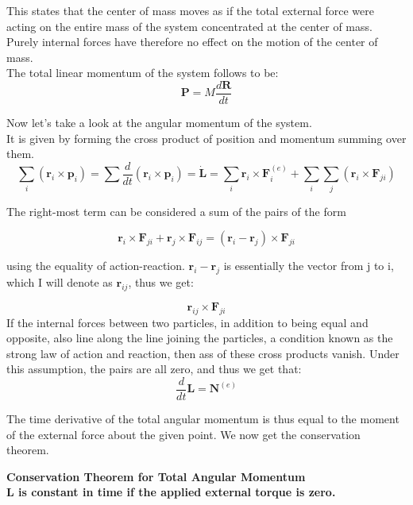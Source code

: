 \documentclass{article}
\newcommand{\bb}[1]{\begin{tcolorbox}
  \textbf{#1}
\end{tcolorbox}}
\begin{document}
This states that the center of mass moves as if the total external force were acting on the entire mass of the system concentrated at the center of mass. Purely internal forces have therefore no effect on the motion of the center of mass.
\\
The total linear momentum of the system follows to be:\\

\begin{equation*}
    \textbf{P} = M \frac{d \textbf{R}}{dt}
\end{equation*}

Now let's take a look at the angular momentum of the system.
\\
It is given by forming the cross product of position and momentum summing over them.\\

\begin{equation*}
    \sum\limits_i (\textbf{r}_i \times \textbf{p}_i) = \sum \frac{d}{dt}(\textbf{r}_i \times \textbf{p}_i) = \dot{\textbf{L}} = \sum\limits_i\textbf{r}_i\times \textbf{F}^{(e)}_i + \sum\limits_i\sum\limits_j (\textbf{r}_i \times \textbf{F}_{ji})
\end{equation*}

The right-most term can be considered a sum of the pairs of the form

\begin{equation*}
    \textbf{r}_i \times \textbf{F}_{ji} + \textbf{r}_j \times \textbf{F}_{ij} = (\textbf{r}_i - \textbf{r}_j) \times \textbf{F}_{ji}
\end{equation*}

using the equality of action-reaction. $\textbf{r}_i - \textbf{r}_j$ is essentially the vector from j to i, which I will denote as $\textbf{r}_{ij}$, thus we get:

\begin{equation*}
    \textbf{r}_{ij} \times \textbf{F}_{ji}
\end{equation*}
If the internal forces between two particles, in addition to being equal and opposite, also line along the line joining the particles, a condition known as the strong law of action and reaction, then ass of these cross products vanish. Under this assumption, the pairs are all zero, and thus we get that:
\\
\begin{equation*}
    \frac{d}{dt}\textbf{L} = \textbf{N}^{(e)}
\end{equation*}

The time derivative of the total angular momentum is thus equal to the moment of the external force about the given point. We now get the conservation theorem.
\\
\bb{Conservation Theorem for Total Angular Momentum\\\newline L is constant in time if the applied external torque is zero.}
\end{document}
